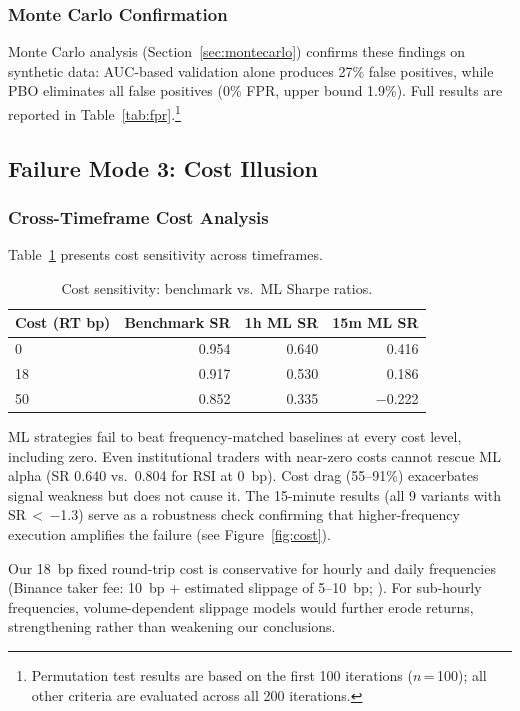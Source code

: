 \documentclass[preprint,12pt,authoryear]{elsarticle}
\begin{document}
\subsubsection{Monte Carlo Confirmation}

Monte Carlo analysis (Section~\ref{sec:montecarlo}) confirms these findings on synthetic data: AUC-based validation alone produces 27\% false positives, while PBO eliminates all false positives (0\% FPR, upper bound 1.9\%). Full results are reported in Table~\ref{tab:fpr}.\footnote{Permutation test results are based on the first 100 iterations ($n$\,=\,100); all other criteria are evaluated across all 200 iterations.}

\subsection{Failure Mode 3: Cost Illusion}

\subsubsection{Cross-Timeframe Cost Analysis}

Table~\ref{tab:cost} presents cost sensitivity across timeframes.

\begin{table}[htbp]
\centering
\caption{Cost sensitivity: benchmark vs.\ ML Sharpe ratios.}
\label{tab:cost}
\begin{tabular}{lrrr}
\toprule
Cost (RT bp) & Benchmark SR & 1h ML SR & 15m ML SR \\
\midrule
0 & 0.954 & 0.640 & 0.416 \\
18 & 0.917 & 0.530 & 0.186 \\
50 & 0.852 & 0.335 & $-$0.222 \\
\bottomrule
\end{tabular}
\end{table}

ML strategies fail to beat frequency-matched baselines at every cost level, including zero. Even institutional traders with near-zero costs cannot rescue ML alpha (SR 0.640 vs.\ 0.804 for RSI at 0~bp). Cost drag (55--91\%) exacerbates signal weakness but does not cause it. The 15-minute results (all 9 variants with SR\,$<$\,$-$1.3) serve as a robustness check confirming that higher-frequency execution amplifies the failure (see Figure~\ref{fig:cost}).

Our 18~bp fixed round-trip cost is conservative for hourly and daily frequencies (Binance taker fee: 10~bp + estimated slippage of 5--10~bp; \citealt{almeida2024microstructure}). For sub-hourly frequencies, volume-dependent slippage models \citep{almgren2001optimal} would further erode returns, strengthening rather than weakening our conclusions.
\end{document}
